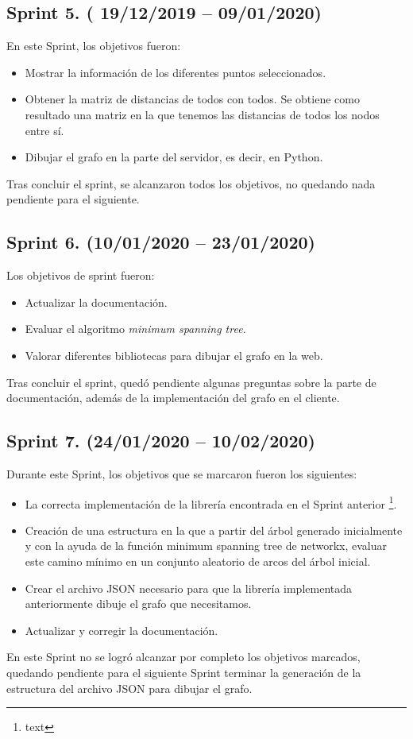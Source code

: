 \subsection{Sprint 5. ( 19/12/2019 -- 09/01/2020)}
En este Sprint, los objetivos fueron:
\begin{itemize}
	\item Mostrar la información de los diferentes puntos seleccionados.
	\item Obtener la matriz de distancias de todos con todos. Se obtiene como resultado una matriz en la que tenemos las distancias de todos los nodos entre sí.
	\item Dibujar el grafo en la parte del servidor, es decir, en Python.
\end{itemize}
Tras concluir el sprint, se alcanzaron todos los objetivos, no quedando nada pendiente para el siguiente.
\subsection{Sprint 6. (10/01/2020 -- 23/01/2020)}
Los objetivos de sprint fueron:
\begin{itemize}
	\item Actualizar la documentación.
	\item Evaluar el algoritmo \textit{minimum spanning tree}.
	\item Valorar diferentes bibliotecas para dibujar el grafo en la web.
\end{itemize}
Tras concluir el sprint, quedó pendiente algunas preguntas sobre la parte de documentación, además de la implementación del grafo en el cliente.
\subsection{Sprint 7. (24/01/2020 -- 10/02/2020)}
Durante este Sprint, los objetivos que se marcaron fueron los siguientes:
\begin{itemize}
	\item La correcta implementación de la librería encontrada en el Sprint anterior \footnote{text}.
	\item Creación de una estructura en la que a partir del árbol generado inicialmente y con la ayuda de la función minimum spanning tree de networkx, evaluar este camino mínimo en un conjunto aleatorio de arcos del árbol inicial.
	\item Crear el archivo JSON necesario para que la librería implementada anteriormente dibuje el grafo que necesitamos. 
	\item Actualizar y corregir la documentación.
\end{itemize}
En este Sprint no se logró alcanzar por completo los objetivos marcados, quedando pendiente para el siguiente Sprint terminar la generación de la estructura del archivo JSON para dibujar el grafo.

